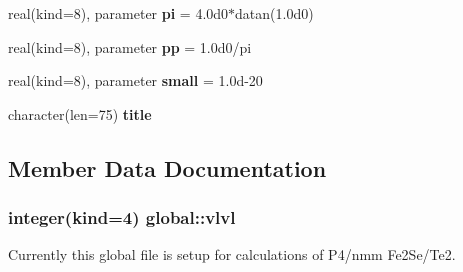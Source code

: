 \begin{DoxyCompactItemize}
\item 
\hypertarget{classglobal_a1cf4e2ab9e6041ada210715e6312df8f}{real(kind=8), parameter {\bfseries pi} = 4.\-0d0$\ast$datan(1.\-0d0)}\label{classglobal_a1cf4e2ab9e6041ada210715e6312df8f}

\item 
\hypertarget{classglobal_aab709ca486b1b1fb10a8785408339f04}{real(kind=8), parameter {\bfseries pp} = 1.\-0d0/pi}\label{classglobal_aab709ca486b1b1fb10a8785408339f04}

\item 
\hypertarget{classglobal_a5e360fcdfdc5e93949d9bf2b007ced72}{real(kind=8), parameter {\bfseries small} = 1.\-0d-\/20}\label{classglobal_a5e360fcdfdc5e93949d9bf2b007ced72}

\item 
\hypertarget{classglobal_a2bfb5f2ffc0da59b895b420c64ed0875}{character(len=75) {\bfseries title}}\label{classglobal_a2bfb5f2ffc0da59b895b420c64ed0875}

\end{DoxyCompactItemize}


\subsection{Member Data Documentation}
\hypertarget{classglobal_a57714656ed3fc78e7923fea192edaf85}{
\subsubsection[{vlvl}]{\setlength{\rightskip}{0pt plus 5cm}integer(kind=4) global\-::vlvl}}\label{classglobal_a57714656ed3fc78e7923fea192edaf85}


Currently this global file is setup for calculations of P4/nmm Fe2\-Se/\-Te2. 



